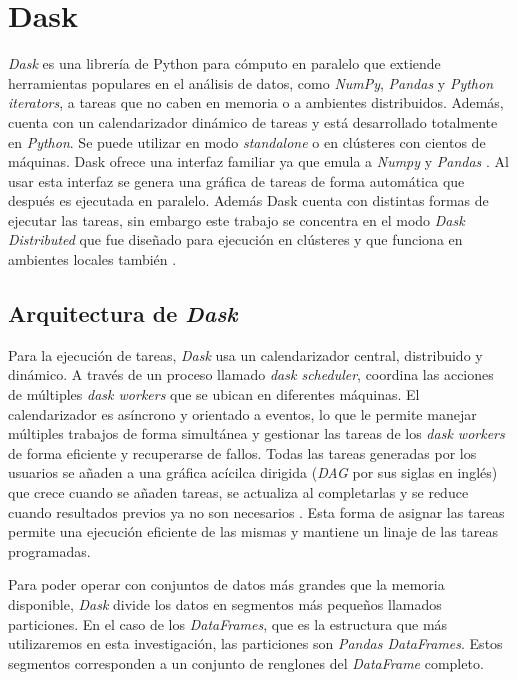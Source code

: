 \section{Dask}

\textit{Dask} es una librería de Python para cómputo en paralelo que extiende herramientas populares en el análisis de datos, como \textit{NumPy}, \textit{Pandas} y \textit{Python iterators}, a tareas que no caben en memoria o a ambientes distribuidos. Además, cuenta con un calendarizador dinámico de tareas y está desarrollado totalmente en \textit{Python}. Se puede utilizar en modo \textit{standalone} o en clústeres con cientos de máquinas. Dask ofrece una interfaz familiar ya que emula a \textit{Numpy} y \textit{Pandas} \cite{daskdocs}. Al usar esta interfaz se genera una gráfica de tareas de forma automática que después es ejecutada en paralelo. Además Dask cuenta con distintas formas de ejecutar las tareas, sin embargo este trabajo se concentra en el modo \textit{Dask Distributed} que fue diseñado para ejecución en clústeres y que funciona en ambientes locales también \cite{daskscheduling}.

\subsection{Arquitectura de \textit{Dask}}

Para la ejecución de tareas, \textit{Dask} usa un calendarizador central, distribuido y dinámico. A través de un proceso llamado \textit{dask scheduler}, coordina las acciones de múltiples \textit{dask workers} que se ubican en diferentes máquinas. El calendarizador es asíncrono y orientado a eventos, lo que le permite manejar múltiples trabajos de forma simultánea y gestionar las tareas de los \textit{dask workers} de forma eficiente y recuperarse de fallos. Todas las tareas generadas por los usuarios se añaden a una gráfica acícilca dirigida (\textit{DAG} por sus siglas en inglés) que crece cuando se añaden tareas, se actualiza al completarlas y se reduce cuando resultados previos ya no son necesarios \cite{daskdistributed}. Esta forma de asignar las tareas permite una ejecución eficiente de las mismas y mantiene un linaje de las tareas programadas.

Para poder operar con conjuntos de datos más grandes que la memoria disponible, \textit{Dask} divide los datos en segmentos más pequeños llamados particiones. En el caso de los \textit{DataFrames}, que es la estructura que más utilizaremos en esta investigación, las particiones son \textit{Pandas DataFrames}. Estos segmentos corresponden a un conjunto de renglones del \textit{DataFrame} completo.


